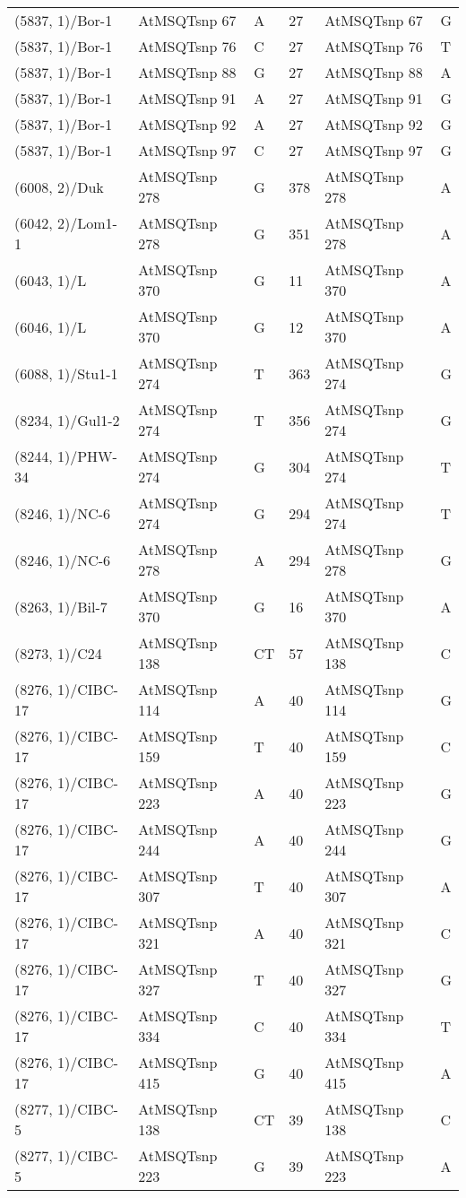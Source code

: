 \begin{center}
\begin{longtable}{|l|l|l|l|l|l|}
(5837, 1)/Bor-1&AtMSQTsnp 67&A&27&AtMSQTsnp 67&G\\
(5837, 1)/Bor-1&AtMSQTsnp 76&C&27&AtMSQTsnp 76&T\\
(5837, 1)/Bor-1&AtMSQTsnp 88&G&27&AtMSQTsnp 88&A\\
(5837, 1)/Bor-1&AtMSQTsnp 91&A&27&AtMSQTsnp 91&G\\
(5837, 1)/Bor-1&AtMSQTsnp 92&A&27&AtMSQTsnp 92&G\\
(5837, 1)/Bor-1&AtMSQTsnp 97&C&27&AtMSQTsnp 97&G\\
(6008, 2)/Duk&AtMSQTsnp 278&G&378&AtMSQTsnp 278&A\\
(6042, 2)/Lom1-1&AtMSQTsnp 278&G&351&AtMSQTsnp 278&A\\
(6043, 1)/L&AtMSQTsnp 370&G&11&AtMSQTsnp 370&A\\
(6046, 1)/L&AtMSQTsnp 370&G&12&AtMSQTsnp 370&A\\
(6088, 1)/Stu1-1&AtMSQTsnp 274&T&363&AtMSQTsnp 274&G\\
(8234, 1)/Gul1-2&AtMSQTsnp 274&T&356&AtMSQTsnp 274&G\\
(8244, 1)/PHW-34&AtMSQTsnp 274&G&304&AtMSQTsnp 274&T\\
(8246, 1)/NC-6&AtMSQTsnp 274&G&294&AtMSQTsnp 274&T\\
(8246, 1)/NC-6&AtMSQTsnp 278&A&294&AtMSQTsnp 278&G\\
(8263, 1)/Bil-7&AtMSQTsnp 370&G&16&AtMSQTsnp 370&A\\
(8273, 1)/C24&AtMSQTsnp 138&CT&57&AtMSQTsnp 138&C\\
(8276, 1)/CIBC-17&AtMSQTsnp 114&A&40&AtMSQTsnp 114&G\\
(8276, 1)/CIBC-17&AtMSQTsnp 159&T&40&AtMSQTsnp 159&C\\
(8276, 1)/CIBC-17&AtMSQTsnp 223&A&40&AtMSQTsnp 223&G\\
(8276, 1)/CIBC-17&AtMSQTsnp 244&A&40&AtMSQTsnp 244&G\\
(8276, 1)/CIBC-17&AtMSQTsnp 307&T&40&AtMSQTsnp 307&A\\
(8276, 1)/CIBC-17&AtMSQTsnp 321&A&40&AtMSQTsnp 321&C\\
(8276, 1)/CIBC-17&AtMSQTsnp 327&T&40&AtMSQTsnp 327&G\\
(8276, 1)/CIBC-17&AtMSQTsnp 334&C&40&AtMSQTsnp 334&T\\
(8276, 1)/CIBC-17&AtMSQTsnp 415&G&40&AtMSQTsnp 415&A\\
(8277, 1)/CIBC-5&AtMSQTsnp 138&CT&39&AtMSQTsnp 138&C\\
(8277, 1)/CIBC-5&AtMSQTsnp 223&G&39&AtMSQTsnp 223&A\\

\end{longtable}
\end{center}
